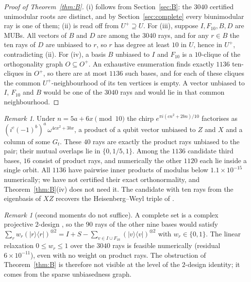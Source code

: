 \documentclass[11pt]{article}
\theoremstyle{definition}
\theoremstyle{remark}
\newtheorem{remark}[lemma]{Remark}
\begin{document}
\begin{proof}[Proof of Theorem~\ref{thm:B}]
(i) follows from Section~\ref{sec:B}: the $3040$ certified unimodular roots are distinct, and by
Section~\ref{sec:complete} every biunimodular ray is one of them; (ii) is read off from $U^+\supseteq U$. For (iii), suppose $I,F_{10},B,D$ are MUBs. All
vectors of $B$ and $D$ are among the $3040$ rays, and for any $r\in B$ the ten rays of $D$ are unbiased to $r$, so
$r$ has degree at least $10$ in $U$, hence in $U^+$, contradicting (ii). For (iv), a basis $B$ unbiased to $I$ and
$F_{10}$ is a $10$-clique of the orthogonality graph $O\subseteq O^+$. An exhaustive enumeration finds
exactly $1136$ ten-cliques in $O^+$, so there are at most $1136$ such bases, and for each of these cliques the common
$U^+$-neighbourhood of its ten vertices is empty.
A vector unbiased to $I$, $F_{10}$ and $B$ would be one of the $3040$ rays and would lie in that common
neighbourhood.
\end{proof}

\begin{remark}\label{rem:chirps}
Under $n=5a+6x\pmod{10}$ the chirp $e^{\pi i(cn^2+2bn)/10}$ factorises as $(i^c(-1)^b)^a\,\omega^{4cx^2+3bx}$,
a product of a qubit vector unbiased to $Z$ and $X$ and a column of some $G_t$. These $40$ rays are exactly the
product rays unbiased to the pair; their mutual overlaps lie in $\{0,1/5,1\}$. Among the $1136$ candidate third bases, $16$ consist of product rays, and numerically the other $1120$ each lie inside
a single orbit. All $1136$ have pairwise inner products of modulus below $1.1\times10^{-15}$ numerically; we have not certified their exact
orthonormality, and Theorem~\ref{thm:B}(iv) does not need it. The candidate with ten rays from the eigenbasis of
$XZ$ recovers the Heisenberg--Weyl triple of \cite{GMMP2017}.
\end{remark}

\begin{remark}[second moments do not suffice]
A complete set is a complex projective $2$-design \cite{KlappeneckerRoetteler2005}, so the $90$ rays of the other nine
bases would satisfy $\sum_rw_r(|r\rangle\langle r|)^{\otimes2}=I+S-\sum_{v\in I\cup F_{10}}(|v\rangle\langle v|)^{\otimes2}$
with $w_r\in\{0,1\}$. The linear relaxation $0\le w_r\le1$ over the $3040$ rays is feasible numerically (residual $6\times10^{-11}$),
even with no weight on product rays. The obstruction of Theorem~\ref{thm:B} is therefore not visible at the level of the $2$-design identity;
it comes from the sparse unbiasedness graph.
\end{remark}
\end{document}
